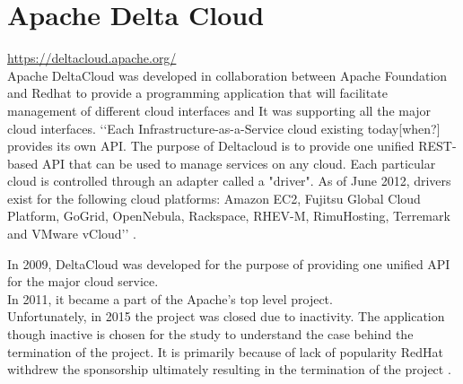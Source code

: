 \section{Apache Delta Cloud}
\url{ https://deltacloud.apache.org/ } \\
Apache DeltaCloud was developed in collaboration between Apache Foundation and Redhat
to provide a programming application that will 
facilitate management of different cloud interfaces and
It was supporting all the major cloud interfaces. 
‘‘Each Infrastructure-as-a-Service cloud existing today[when?] provides
its own API. The purpose of Deltacloud is to provide one unified 
REST-based API that can be used to manage services on any cloud. Each particular 
cloud is controlled through an adapter called a "driver". As of June 2012, drivers 
exist for the following cloud platforms: Amazon EC2, Fujitsu Global Cloud Platform, 
GoGrid, OpenNebula, Rackspace, RHEV-M, RimuHosting, Terremark and VMware vCloud’’ 
\cite{hid-sp18-417-wiki-deltacloud}.

In 2009, DeltaCloud was developed for the purpose of providing one unified 
API for the major cloud service. \\
In 2011, it became a part of the Apache’s top level project. \\ Unfortunately,
in 2015 the project was closed due to inactivity. 
The application though inactive is chosen for the study to understand 
the case behind the termination of the project. 
It is primarily because of lack of popularity RedHat withdrew the 
sponsorship ultimately resulting in the 
termination of the project .
